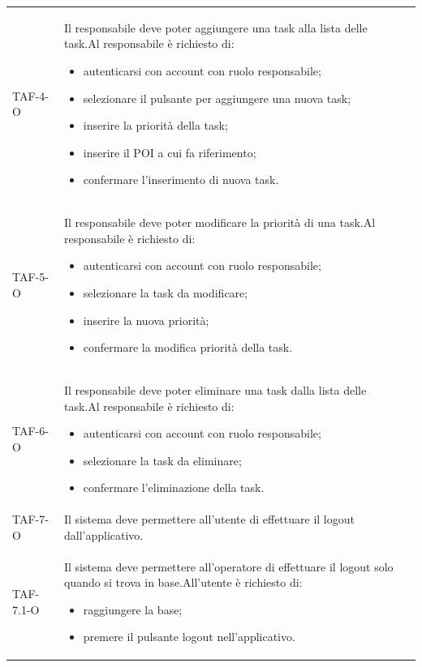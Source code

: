 \begin{longtable}{ >{\centering}p{} >{}p{}
		>{\centering}p{}}
	TAF-4-O & Il responsabile deve poter aggiungere una task alla lista delle task.\newline Al responsabile è richiesto di: \begin{itemize}\item autenticarsi con account con ruolo responsabile; \item selezionare il pulsante per aggiungere una nuova task; \item inserire la priorità della task; \item inserire il POI a cui fa riferimento; \item confermare l'inserimento di nuova task. \end{itemize} & 0\tabularnewline
	
	TAF-5-O & Il responsabile deve poter modificare la priorità di una task.\newline Al responsabile è richiesto di: \begin{itemize}\item autenticarsi con account con ruolo responsabile; \item selezionare la task da modificare; \item inserire la nuova priorità; \item confermare la modifica priorità della task. \end{itemize} & 0\tabularnewline
	
	TAF-6-O & Il responsabile deve poter eliminare una task dalla lista delle task.\newline Al responsabile è richiesto di: \begin{itemize} \item autenticarsi con account con ruolo responsabile; \item selezionare la task da eliminare; \item confermare l'eliminazione della task. \end{itemize} & 0\tabularnewline
	
	TAF-7-O & Il sistema deve permettere all'utente di effettuare il logout dall'applicativo. & 0\tabularnewline
	
	TAF-7.1-O & Il sistema deve permettere all'operatore di effettuare il logout solo quando si trova in base.\newline All'utente è richiesto di: \begin{itemize} \item raggiungere la base; \item premere il pulsante logout nell'applicativo. \end{itemize} & 0\tabularnewline
	

\end{longtable}
